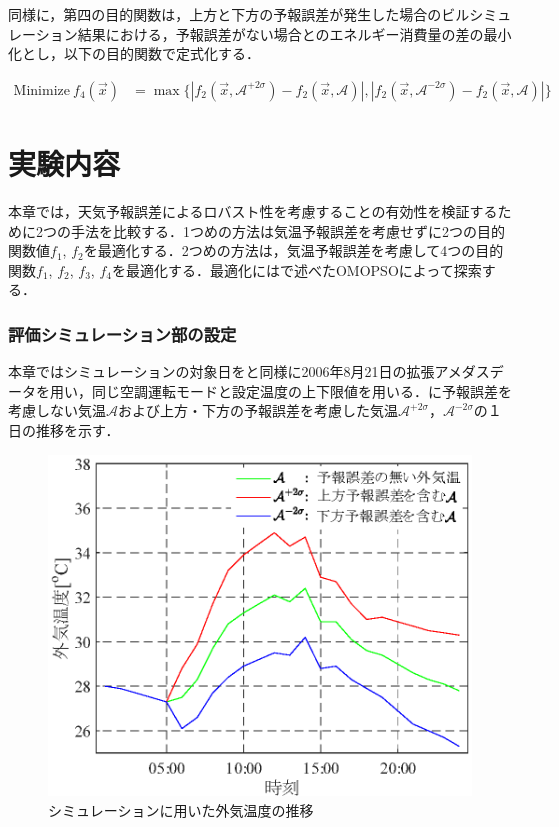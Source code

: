 同様に，第四の目的関数は，上方と下方の予報誤差が発生した場合のビルシミュレーション結果における，予報誤差がない場合とのエネルギー消費量の差の最小化とし，以下の目的関数で定式化する．

\begin{align}
    \text{Minimize}~f_4(\vec{x}) & = \max \{|f_2(\vec{x}, \mathcal{A}^{+2\sigma})-f_2(\vec{x}, \mathcal{A})|, |f_2(\vec{x}, \mathcal{A}^{-2\sigma})-f_2(\vec{x}, \mathcal{A})|\}
    \label{eq::robust_objective4}
\end{align}

\section{実験内容}
本章では，天気予報誤差によるロバスト性を考慮することの有効性を検証するために2つの手法を比較する．1つめの方法は気温予報誤差を考慮せずに2つの目的関数値$f_1$, $f_2$を最適化する．2つめの方法は，気温予報誤差を考慮して4つの目的関数$f_1$, $f_2$, $f_3$, $f_4$を最適化する．最適化にはで述べたOMOPSOによって探索する．

\subsubsection{評価シミュレーション部の設定}
本章ではシミュレーションの対象日をと同様に2006年8月21日の拡張アメダスデータを用い，同じ空調運転モードと設定温度の上下限値を用いる．に予報誤差を考慮しない気温$\mathcal{A}$および上方・下方の予報誤差を考慮した気温$\mathcal{A}^{+2\sigma}$，$\mathcal{A}^{-2\sigma}$の１日の推移を示す．

\begin{figure}[ht]
    \begin{center}
        \includegraphics[width=0.7\linewidth]{fig/robust_outside_temp.eps}
    \end{center}
    \caption{シミュレーションに用いた外気温度の推移}
    \label{fig::robust_outside_temp}
\end{figure}


